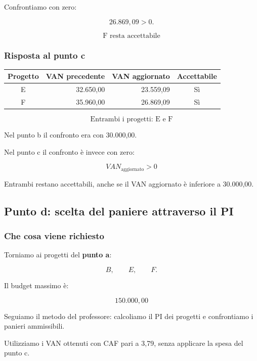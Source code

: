 \noindent Confrontiamo con zero:

\[
26.869{,}09>0.
\]

\[
\boxed{
\text{F resta accettabile}
}
\]


\subsubsection*{Risposta al punto c}

\begin{center}
    \small
    \begin{tabular}{|c|r|r|c|}
        \hline
        \textbf{Progetto}
        & \textbf{VAN precedente}
        & \textbf{VAN aggiornato}
        & \textbf{Accettabile} \\
        \hline
        E & 32.650,00 & 23.559,09 & Sì \\
        F & 35.960,00 & 26.869,09 & Sì \\
        \hline
    \end{tabular}
\end{center}

\[
\boxed{
\text{Entrambi i progetti: E e F}
}
\]

\noindent Nel punto b il confronto
era con 30.000,00.

\noindent Nel punto c il confronto
è invece con zero:

\[
\boxed{
VAN_{\text{aggiornato}}>0
}
\]

\noindent Entrambi restano accettabili,
anche se il VAN aggiornato
è inferiore a 30.000,00.


\subsection{Punto d:
scelta del paniere attraverso il PI}

\subsubsection*{Che cosa viene richiesto}

\noindent Torniamo ai progetti
del \textbf{punto a}:

\[
B,\qquad E,\qquad F.
\]

\noindent Il budget massimo è:

\[
\boxed{150.000{,}00}
\]

\noindent Seguiamo il metodo del professore:
calcoliamo il PI dei progetti
e confrontiamo i panieri ammissibili.

\noindent Utilizziamo i VAN ottenuti
con CAF pari a 3,79,
senza applicare la spesa del punto c.


